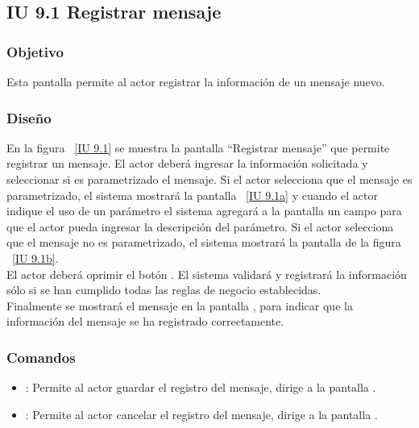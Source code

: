 \subsection{IU 9.1 Registrar mensaje}

\subsubsection{Objetivo}
	
	Esta pantalla permite al actor registrar la información de un mensaje nuevo.

\subsubsection{Diseño}

    En la figura ~\ref{IU 9.1} se muestra la pantalla ``Registrar mensaje'' que permite registrar un mensaje. El actor deberá ingresar la información solicitada 
    y seleccionar si es parametrizado el mensaje. Si el actor selecciona que el mensaje es parametrizado, el sistema mostrará la pantalla ~\ref{IU 9.1a} y 
    cuando el actor indique el uso de un parámetro el sistema agregará a la pantalla un campo para que el actor pueda ingresar la descripción del parámetro. 
    Si el actor selecciona que el mensaje no es parametrizado, el sistema mostrará la pantalla de la figura ~\ref{IU 9.1b}.\\
    
    
    El actor deberá oprimir el botón . El sistema validará y registrará la información sólo si se han cumplido todas las reglas de negocio establecidas.  \\
    
    Finalmente se mostrará el mensaje  en la pantalla , para indicar que la información del mensaje
    se ha registrado correctamente.        



\subsubsection{Comandos}
\begin{itemize}
	\item {}: Permite al actor guardar el registro del mensaje, dirige a la pantalla .
	\item {}: Permite al actor cancelar el registro del mensaje, dirige a la pantalla .
\end{itemize}

